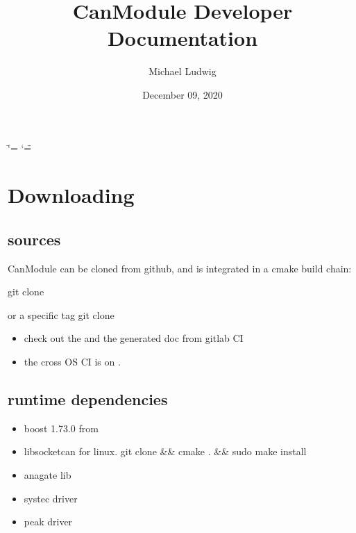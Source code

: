 \documentclass[a4paper,10pt,english]{sphinxmanual}
\title{CanModule Developer Documentation}
\date{December 09, 2020}
\author{Michael Ludwig}
\begin{document}
\ifdefined\shorthandoff
  \ifnum\catcode`\=\string=\active\shorthandoff{=}\fi
  \ifnum\catcode`\"=\active{}\fi
\fi

\pagestyle{empty}
\sphinxmaketitle
\pagestyle{plain}
\sphinxtableofcontents
\pagestyle{normal}
\label{\detokenize{index::doc}}



\chapter{Downloading}
\label{\detokenize{downloading:downloading}}\label{\detokenize{downloading::doc}}

\section{sources}
\label{\detokenize{downloading:sources}}
CanModule can be cloned from github, and is integrated in a cmake build chain:

git clone 

or a specific tag
git clone  
\begin{itemize}
\item {} 
check out the  and the generated doc from gitlab CI

\item {} 
the cross OS CI is on  .

\end{itemize}


\section{runtime dependencies}
\label{\detokenize{downloading:runtime-dependencies}}\begin{itemize}
\item {} 
boost 1.73.0 from 

\item {} 
libsocketcan for linux.
git clone  \&\& cmake . \&\& sudo make install

\item {} 
anagate lib

\item {} 
systec driver

\item {} 
peak driver

\end{itemize}
\end{document}
